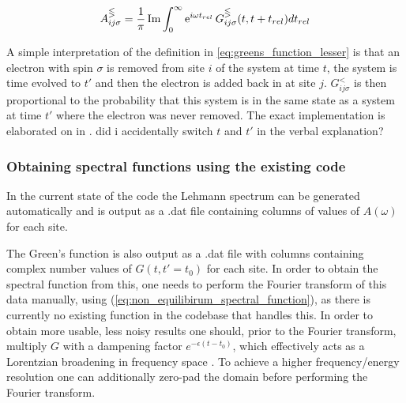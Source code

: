 \begin{equation}
    A_{ij\sigma}^\gtlt = \frac{1}{\pi} \operatorname{Im}\int_0^\infty \operatorname{e}^{i\omega t_{rel}} G_{ij\sigma}^\gtlt (t,t+t_{rel}) dt_{rel}\label{eq:non_equilibirum_spectral_function}
\end{equation}

A simple interpretation of the definition in \ref{eq:greens_function_lesser} is that an electron with spin $\sigma$ is removed from site $i$ of the system at time $t$, the system is time evolved to $t'$ and then the electron is added back in at site $j$. $G_{ij\sigma}^{<}$ is then proportional to the probability that this system is in the same state as a system at time $t'$ where the electron was never removed. The exact implementation is elaborated on in \cite{worm_bachelor}. {\color{red} did i accidentally switch $t$ and $t'$ in the verbal explanation?}

\subsubsection{Obtaining spectral functions using the existing code}

In the current state of the code the Lehmann spectrum can be generated automatically and is output as a .dat file containing columns of values of $A(\omega)$ for each site.

\bigskip
The Green's function is also output as a .dat file with columns containing complex number values of $G(t,t'=t_0)$ for each site. In order to obtain the spectral function from this, one needs to perform the Fourier transform of this data manually, using (\ref{eq:non_equilibirum_spectral_function}), as there is currently no existing function in the codebase that handles this. In order to obtain more usable, less noisy results one should, prior to the Fourier transform, multiply $G$ with a dampening factor $e^{-\epsilon (t-t_0)}$, which effectively acts as a Lorentzian broadening in frequency space \cite{spectral_function}. To achieve a higher frequency/energy resolution one can additionally zero-pad the domain before performing the Fourier transform. 